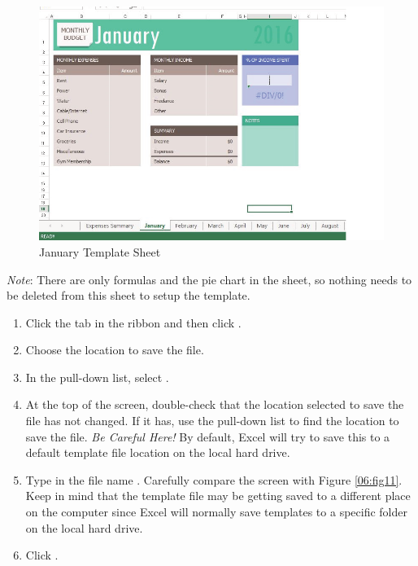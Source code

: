 \begin{figure}[H]
	\centering
	\includegraphics[width=\maxwidth{.95\linewidth}]{gfx/ch06_fig10}
	\caption{January Template Sheet}
	\label{06:fig10}
\end{figure}

\textit{Note}: There are only formulas and the pie chart in the  sheet, so nothing needs to be deleted from this sheet to setup the template.

\begin{enumerate}
	\item Click the  tab in the ribbon and then click .
	\item Choose the location to save the file.
	\item In the  pull-down list, select .
	\item At the top of the screen, double-check that the location selected to save the file has not changed. If it has, use the pull-down list to find the location to save the file. \textit{Be Careful Here!} By default, Excel will try to save this to a default template file location on the local hard drive.
	\item Type in the file name . Carefully compare the screen with Figure \ref{06:fig11}. Keep in mind that the template file may be getting saved to a different place on the computer since Excel will normally save templates to a specific folder on the local hard drive.
	\item Click .
\end{enumerate}

